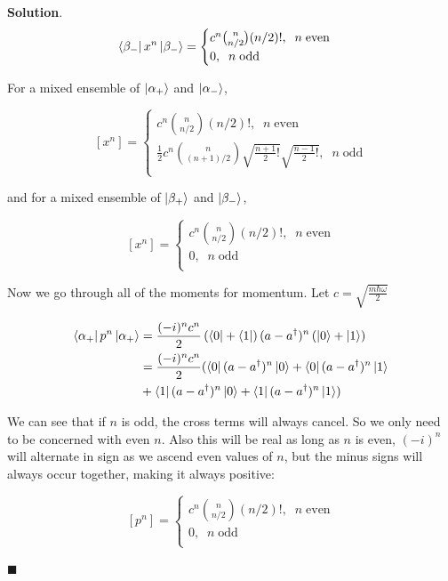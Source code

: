 \documentclass[12pt]{article}
\theoremstyle{definition}
\newenvironment{s}{%
        \begin{trivlist} \item \textbf{Solution}. }{%
            \hspace*{\fill} $\blacksquare$\end{trivlist}}%
\begin{document}
{\begin{s}
$$
\bra{\beta_-}x^{n}\ket{\beta_-}=
\begin{cases}
c^{n}{n\choose n/2}(n/2)!, \;\;n \;\mathrm{even} \\
0, \;\;n \;\mathrm{odd} \\
\end{cases}
$$

For a mixed ensemble of $\ket{\alpha_{+}}$ and $\ket{\alpha_{-}}$, 

$$
[x^{n}] =
\begin{cases}
c^{n}{n\choose n/2}(n/2)!, \;\;n \;\mathrm{even} \\
\frac{1}{2}c^{n}{n\choose (n+1)/2}\sqrt{\frac{n+1}{2}!}\sqrt{\frac{n-1}{2}!}, \;\;n \;\mathrm{odd} \\
\end{cases}
$$

and for a mixed ensemble of $\ket{\beta_{+}}$ and $\ket{\beta_{-}}$, 

$$
[x^{n}] =
\begin{cases}
c^{n}{n\choose n/2}(n/2)!, \;\;n \;\mathrm{even} \\
0, \;\;n \;\mathrm{odd} \\
\end{cases}
$$

Now we go through all of the moments for momentum. Let $c = \sqrt{\frac{m\hbar\omega}{2}}$

\begin{align*}
\bra{\alpha_+}p^{n}\ket{\alpha_+} &= \frac{(-i)^{n}c^{n}}{2}\left(\bra{0} + \bra{1}\right)(a-a^{\dagger})^{n}\left(\ket{0} + \ket{1}\right)\\
&= \frac{(-i)^{n}c^{n}}{2}(\bra{0}(a-a^{\dagger})^{n}\ket{0} + \bra{0}(a-a^{\dagger})^{n}\ket{1}\\
&+ \bra{1}(a-a^{\dagger})^{n}\ket{0} + \bra{1}(a-a^{\dagger})^{n}\ket{1})
\end{align*}

We can see that if $n$ is odd, the cross terms will always cancel. So we only need to be concerned with even $n$. Also this will be real as long as $n$ is even, $(-i)^{n}$ will alternate in sign as we ascend even values of $n$, but the minus signs will always occur together, making it always positive:

$$
[p^{n}] =
\begin{cases}
c^{n}{n\choose n/2}(n/2)!, \;\;n \;\mathrm{even} \\
0, \;\;n \;\mathrm{odd} \\
\end{cases}
$$


\end{s}}
\end{document}
